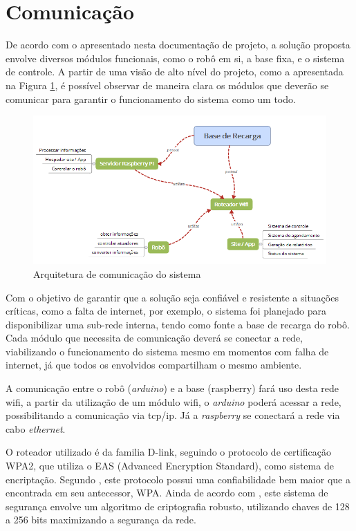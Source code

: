 
\section{Comunicação} %
\label{sub:comunicação}
	De acordo com o apresentado nesta documentação de projeto, a solução proposta envolve diversos módulos funcionais, como o robô em si, a base fixa, e o sistema de controle. A partir de uma visão de alto nível do projeto, como a apresentada na Figura \ref{img:arq_comu}, é possível observar de maneira clara os módulos que deverão se comunicar para garantir o funcionamento do sistema como um todo.

	\begin{figure}[H]
		\centering
		\includegraphics[scale=0.8]{figuras/arquitetura_comunicacao.png}
		\caption{Arquitetura de comunicação do sistema}
		\label{img:arq_comu}
	\end{figure}

	Com o objetivo de garantir que a solução seja confiável e resistente a situações críticas, como a falta de internet, por exemplo, o sistema foi planejado para disponibilizar uma sub-rede interna, tendo como fonte a base de recarga do robô. Cada módulo que necessita de comunicação deverá se conectar a rede, viabilizando o funcionamento do sistema mesmo em momentos com falha de internet, já que todos os envolvidos compartilham o mesmo ambiente.

	A comunicação entre o robô (\textit{arduino}) e a base (raspberry) fará uso desta rede wifi, a partir da utilização de um módulo wifi, o \textit{arduino} poderá acessar a rede, possibilitando a comunicação via tcp/ip. Já a \textit{raspberry} se conectará a rede via cabo \textit{ethernet}.

	O roteador utilizado é da familia D-link, seguindo o protocolo de certificação WPA2, que utiliza o EAS (Advanced Encryption Standard), como sistema de encriptação. Segundo \cite{wpa2}, este protocolo possui uma confiabilidade bem maior que a encontrada em seu antecessor, WPA. Ainda de acordo com \cite{wpa2}, este sistema de segurança envolve um algoritmo de criptografia robusto, utilizando chaves de 128 a 256 bits maximizando a segurança da rede.


